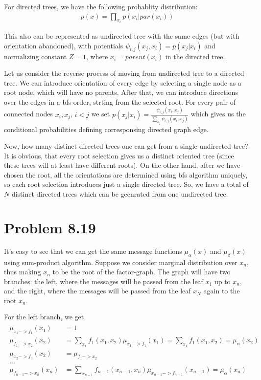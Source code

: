 \documentclass[fleqn]{article}
\begin{document}
For directed trees, we have the following probablity distribution:
\begin{align}
	p(x) = \prod\limits_{x_i} p(x_i | par(x_i))
\end{align}

This also can be represented as undirected tree with the same edges (but with orientation abandoned), with potentials $\psi_{i,j}(x_j, x_i) = p(x_j | x_i)$ and normalizing constant $Z = 1$, where $x_i = parent(x_i)$ in the directed tree.

Let us consider the reverse process of moving from undirected tree to a directed tree. We can introduce orientation of every edge by selecting a single node as a root node, which will have no parents. After that, we can introduce directions over the edges in a bfs-order, strting from the selected root. For every pair of connected nodes $x_i, x_j$, $i < j$ we set $p(x_j | x_i) = \frac{\psi_{i,j}(x_i, x_j)}{\sum\limits_{x_j}\psi_{i,j}(x_i, x_j)}$
which gives us the conditional probabilities defining corresponsing directed graph edge.


Now, how many distinct directed trees one can get from a single undirected tree? It is obvious, that every root selection gives us a distinct oriented tree (since these trees will at least have different roots). On the other hand, after we have chosen the root, all the orientations are determined using bfs algorithm uniquely, so each root selection introduces just a single directed tree. So, we have a total of $N$ distinct directed trees which can be geenrated from one undirected tree.


\section*{Problem 8.19}

It's easy to see that we can get the same message functions $\mu_\alpha(x)$ and $\mu_\beta(x)$ using sum-product algorithm. Suppose we consider marginal distribution over $x_n$, thus making $x_n$ to be the root of the factor-graph. The graph will have two branches: the left, where the messages will be passed from the leaf $x_1$ up to $x_n$, and the right, where the messages will be passed from the leaf $x_N$ again to the root $x_n$.

For the left branch, we get
\begin{align}
\begin{split}
\mu_{x_1->f_1} (x_1)&= 1 \\
\mu_{f_1->x_2} (x_2)&= \sum\limits_{x_1}f_1(x_1, x_2)\mu_{x_1->f_1}(x_1) = \sum\limits_{x_1}f_1(x_1, x_2) = \mu_\alpha(x_2)\\
\mu_{x_2->f_3}(x_2) &= \mu_{f_1->x_2}\\
\ldots\\
\mu_{f_{n-1}->x_n}(x_n) &= \sum\limits_{x_{n-1}}f_{n-1}(x_{n-1}, x_{n})\mu_{x_{n-1}->f_{n-1}}(x_{n-1}) = \mu_\alpha(x_n)
\end{split}
\end{align}
\end{document}
